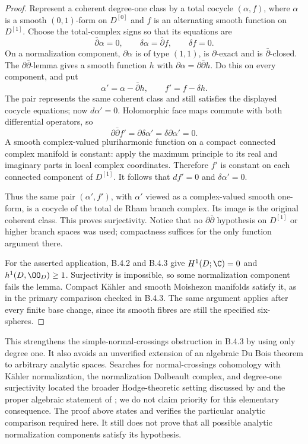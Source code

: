 \begin{proof}
Represent a coherent degree-one class by a total cocycle
$(\alpha,f)$, where $\alpha$ is a smooth $(0,1)$-form on
$D^{[0]}$ and $f$ is an alternating smooth function on
$D^{[1]}$. Choose the total-complex signs so that its equations
are
\[
 \bar\partial\alpha=0,\qquad
 \delta\alpha=\bar\partial f,\qquad \delta f=0.
\]
On a normalization component, $\partial\alpha$ is of type
$(1,1)$, is $\partial$-exact and is $\bar\partial$-closed.
The $\partial\bar\partial$-lemma gives a smooth function $h$
with $\partial\alpha=\partial\bar\partial h$.
Do this on every component, and put
\[
 \alpha'=\alpha-\bar\partial h,\qquad
 f'=f-\delta h.
\]
The pair represents the same coherent class and still satisfies
the displayed cocycle equations; now $d\alpha'=0$.
Holomorphic face maps commute with both differential operators,
so
\[
 \partial\bar\partial f'
       =\partial\delta\alpha'=\delta\partial\alpha'=0.
\]
A smooth complex-valued pluriharmonic function on a compact
connected complex manifold is constant: apply the maximum
principle to its real and imaginary parts in local complex
coordinates. Therefore $f'$ is constant on each connected
component of $D^{[1]}$. It follows that
$df'=0$ and $\delta\alpha'=0$.

Thus the same pair $(\alpha',f')$, with $\alpha'$ viewed as
a complex-valued smooth one-form, is a cocycle of the total
de Rham branch complex. Its image is the original coherent
class. This proves surjectivity. Notice that no
$\partial\bar\partial$ hypothesis on $D^{[1]}$ or higher
branch spaces was used; compactness suffices for the only
function argument there.

For the asserted application, B.4.2 and B.4.3 give
$H^1(D;\C)=0$ and $h^1(D,\OO_D)\geq1$.
Surjectivity is impossible, so some normalization component
fails the lemma. Compact K\"ahler and smooth Moishezon
manifolds satisfy it, as in the primary comparison checked
in B.4.3. The same argument applies after every finite base
change, since its smooth fibres are still the specified
six-spheres.
\end{proof}

This strengthens the simple-normal-crossings obstruction in
B.4.3 by using only degree one. It also avoids an unverified
extension of an algebraic Du Bois theorem to arbitrary analytic
spaces. Searches for normal-crossings cohomology with K\"ahler
normalization, the normalization Dolbeault complex, and
degree-one surjectivity located the broader Hodge-theoretic
setting discussed by \citet{Chen2026HodgeRoot} and the proper
algebraic statement of \citet{GrafKovacs2014Root}; we do not
claim priority for this elementary consequence. The proof above
states and verifies the particular analytic comparison required
here. It still does not prove that all possible analytic
normalization components satisfy its hypothesis.

